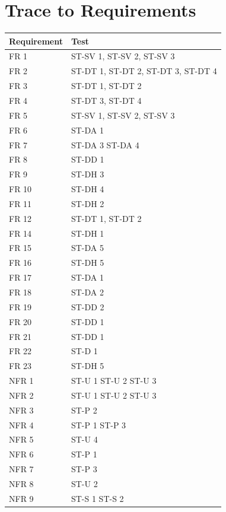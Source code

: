\documentclass[12pt, titlepage]{article}
\begin{document}
\section{Trace to Requirements}
\begin{tabular}{| p{} | p{}|}
  \hline
  \rowcolor[gray]{0.9}
  Requirement & Test \\
  \hline
  FR 1 & ST-SV 1, ST-SV 2, ST-SV 3 \\
  \hline
  FR 2 & ST-DT 1, ST-DT 2, ST-DT 3, ST-DT 4 \\
  \hline
  FR 3 & ST-DT 1, ST-DT 2 \\
  \hline
  FR 4 & ST-DT 3, ST-DT 4 \\
  \hline
  FR 5 & ST-SV 1, ST-SV 2, ST-SV 3 \\
  \hline
  FR 6 & ST-DA 1 \\
  \hline
  FR 7 & ST-DA 3 ST-DA 4 \\
  \hline
  FR 8 & ST-DD 1 \\
  \hline
  FR 9 & ST-DH 3 \\
  \hline
  FR 10 & ST-DH 4 \\
  \hline
  FR 11 & ST-DH 2 \\
  \hline
  FR 12 & ST-DT 1, ST-DT 2 \\
  \hline
  FR 14 & ST-DH 1 \\
  \hline
  FR 15 & ST-DA 5\\
  \hline
  FR 16 & ST-DH 5 \\
  \hline
  FR 17 & ST-DA 1 \\
  \hline
  FR 18 & ST-DA 2 \\
  \hline
  FR 19 & ST-DD 2 \\
  \hline
  FR 20 & ST-DD 1 \\
  \hline
  FR 21 & ST-DD 1 \\
  \hline
  FR 22 & ST-D 1 \\
  \hline
  FR 23 & ST-DH 5 \\
  \hline
  NFR 1 & ST-U 1 ST-U 2 ST-U 3 \\
  \hline
  NFR 2 & ST-U 1 ST-U 2 ST-U 3 \\
  \hline
  NFR 3 & ST-P 2 \\
  \hline
  NFR 4 & ST-P 1 ST-P 3 \\
  \hline
  NFR 5 & ST-U 4 \\
  \hline
  NFR 6 & ST-P 1 \\
  \hline
  NFR 7 & ST-P 3 \\
  \hline
  NFR 8 & ST-U 2 \\
  \hline
  NFR 9 & ST-S 1 ST-S 2 \\
  \hline
\end{tabular}
		
\end{document}
